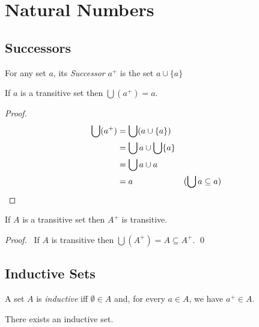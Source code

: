 \chapter{Natural Numbers}

\section{Successors}

\begin{definition}
For any set $a$, its \emph{Successor} $a^+$ is the set $a \cup \{ a \}$    
\end{definition}

\begin{theorem}
    If $a$ is a transitive set then $\bigcup (a^+) = a$.
\end{theorem}

\begin{proof}
    \pf
    \begin{align*}
        \bigcup (a^+) & = \bigcup (a \cup \{a\}) \\
        & = \bigcup a \cup \bigcup \{a\} \\
        & = \bigcup a \cup a \\
        & = a & (\bigcup a \subseteq a) \qed
    \end{align*}
\end{proof}

\begin{theorem}
    \label{theorem:transitive_successor}
    If $A$ is a transitive set then $A^+$ is transitive.
\end{theorem}

\begin{proof}
    \pf\ If $A$ is transitive then $\bigcup (A^+) = A \subseteq A^+$. \qed
\end{proof}

\section{Inductive Sets}

\begin{definition}
    A set $A$ is \emph{inductive} iff $\emptyset \in A$ and, for every $a \in A$,
    we have $a^+ \in A$.
\end{definition}

\begin{axiom}
    There exists an inductive set.
\end{axiom}

